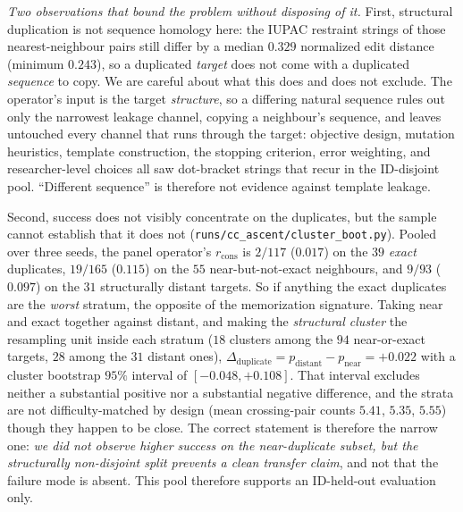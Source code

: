 \documentclass[11pt]{article}
\begin{document}
\smallskip\noindent\emph{Two observations that bound the problem without disposing of it.} First, structural
duplication is not sequence homology here: the IUPAC restraint strings of those nearest-neighbour pairs still
differ by a median $0.329$ normalized edit distance (minimum $0.243$), so a duplicated \emph{target} does not
come with a duplicated \emph{sequence} to copy. We are careful about what this does and does not exclude. The
operator's input is the target \emph{structure}, so a differing natural sequence rules out only the narrowest leakage channel, copying a neighbour's sequence, and leaves untouched every channel that runs through the
target: objective design, mutation heuristics, template construction, the stopping criterion, error weighting,
and researcher-level choices all saw dot-bracket strings that recur in the ID-disjoint pool. ``Different
sequence'' is therefore not evidence against template leakage.

\smallskip\noindent Second, success does not visibly concentrate on the duplicates, but the sample cannot
establish that it does not (\texttt{runs/cc\_ascent/cluster\_boot.py}). Pooled over three seeds, the panel
operator's $r_{\mathrm{cons}}$ is $2/117$ ($0.017$) on the $39$ \emph{exact} duplicates, $19/165$ ($0.115$) on
the $55$ near-but-not-exact neighbours, and $9/93$ ($0.097$) on the $31$ structurally distant targets. So if
anything the exact duplicates are the \emph{worst} stratum, the opposite of the memorization signature. Taking
near and exact together against distant, and making the \emph{structural cluster} the resampling unit inside
each stratum ($18$ clusters among the $94$ near-or-exact targets, $28$ among the $31$ distant ones),
$\Delta_{\mathrm{duplicate}}=p_{\mathrm{distant}}-p_{\mathrm{near}}={+}0.022$ with a cluster bootstrap $95\%$
interval of $[{-}0.048,{+}0.108]$. That interval excludes neither a substantial positive nor a substantial
negative difference, and the strata are not difficulty-matched by design (mean crossing-pair counts $5.41$,
$5.35$, $5.55$) though they happen to be close. The correct statement is therefore the narrow one: \emph{we did
not observe higher success on the near-duplicate subset, but the structurally non-disjoint split prevents a
clean transfer claim}, and not that the failure mode is absent. This pool therefore supports an ID-held-out
evaluation only.
\end{document}
